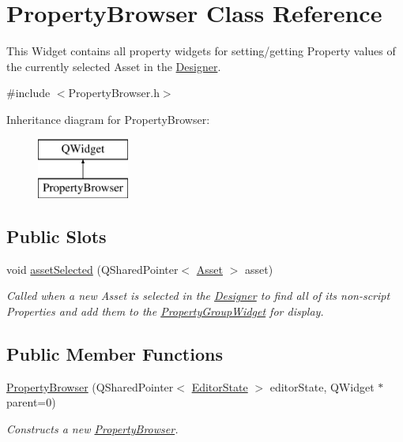 \hypertarget{class_property_browser}{\section{Property\-Browser Class Reference}
\label{class_property_browser}
}


This Widget contains all property widgets for setting/getting Property values of the currently selected Asset in the \hyperlink{class_designer}{Designer}.  




{\ttfamily \#include $<$Property\-Browser.\-h$>$}

Inheritance diagram for Property\-Browser\-:\begin{figure}[H]
\begin{center}
\leavevmode
\includegraphics[height=2.000000cm]{class_property_browser}
\end{center}
\end{figure}
\subsection*{Public Slots}
\begin{DoxyCompactItemize}
\item 
\hypertarget{class_property_browser_ac546dc8fd8e9dae3e95b05b58604276d}{void \hyperlink{class_property_browser_ac546dc8fd8e9dae3e95b05b58604276d}{asset\-Selected} (Q\-Shared\-Pointer$<$ \hyperlink{class_picto_1_1_asset}{Asset} $>$ asset)}\label{class_property_browser_ac546dc8fd8e9dae3e95b05b58604276d}

\begin{DoxyCompactList}\small\item\em Called when a new Asset is selected in the \hyperlink{class_designer}{Designer} to find all of its non-\/script Properties and add them to the \hyperlink{class_property_group_widget}{Property\-Group\-Widget} for display. \end{DoxyCompactList}\end{DoxyCompactItemize}
\subsection*{Public Member Functions}
\begin{DoxyCompactItemize}
\item 
\hyperlink{class_property_browser_a70d0636d05b2fce5a95437f61b41e3b9}{Property\-Browser} (Q\-Shared\-Pointer$<$ \hyperlink{class_editor_state}{Editor\-State} $>$ editor\-State, Q\-Widget $\ast$parent=0)
\begin{DoxyCompactList}\small\item\em Constructs a new \hyperlink{class_property_browser}{Property\-Browser}. \end{DoxyCompactList}\end{DoxyCompactItemize}


